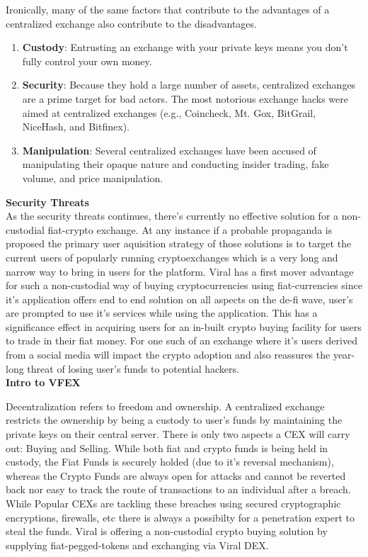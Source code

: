 \documentclass[10pt]{article}
\begin{document}
Ironically, many of the same factors that contribute to the advantages of a centralized exchange also contribute to the disadvantages.
\begin{enumerate}[leftmargin=+0.2in]
\item \textbf{Custody}: Entrusting an exchange with your private keys means you don’t fully control your own money.

\item \textbf{Security}: Because they hold a large number of assets, centralized exchanges are a prime target for bad actors. The most notorious exchange hacks were aimed at centralized exchanges (e.g., Coincheck, Mt. Gox, BitGrail, NiceHash, and Bitfinex).

\item \textbf{Manipulation}: Several centralized exchanges have been accused of manipulating their opaque nature and conducting insider trading, fake volume, and price manipulation.
\end{enumerate}

\textbf{Security Threats}\\

As the security threats continues, there's currently no effective solution for a non-custodial fiat-crypto exchange. At any instance if a probable propaganda is proposed the primary user aquisition strategy of those solutions is to target the current users of popularly running cryptoexchanges which is a very long and narrow way to bring in users for the platform. Viral has a first mover advantage for such a non-custodial way of buying cryptocurrencies using fiat-currencies since it's application offers end to end solution on all aspects on the de-fi wave, user's are prompted to use it's services while using the application. This has a significance effect in acquiring users for an in-built crypto buying facility for users to trade in their fiat money. For one such of an exchange where it's users derived from a social media will impact the crypto adoption and also reassures the year-long threat of losing user's funds to potential hackers.\\

\textbf{Intro to VFEX}

Decentralization refers to freedom and ownership. A centralized exchange restricts the ownership by being a custody to user's funds by maintaining the private keys on their central server. There is only two aspects a CEX will carry out: Buying and Selling. While both fiat and crypto funds is being held in custody, the Fiat Funds is securely holded (due to it's reversal mechanism), whereas the Crypto Funds are always open for attacks and cannot be reverted back nor easy to track the route of transactions to an individual after a breach. While Popular CEXs are tackling these breaches using secured cryptographic encryptions, firewalls, etc there is always a possibilty for a penetration expert to steal the funds. Viral is offering a non-custodial crypto buying solution by supplying fiat-pegged-tokens and exchanging via Viral DEX.\\
\end{document}
